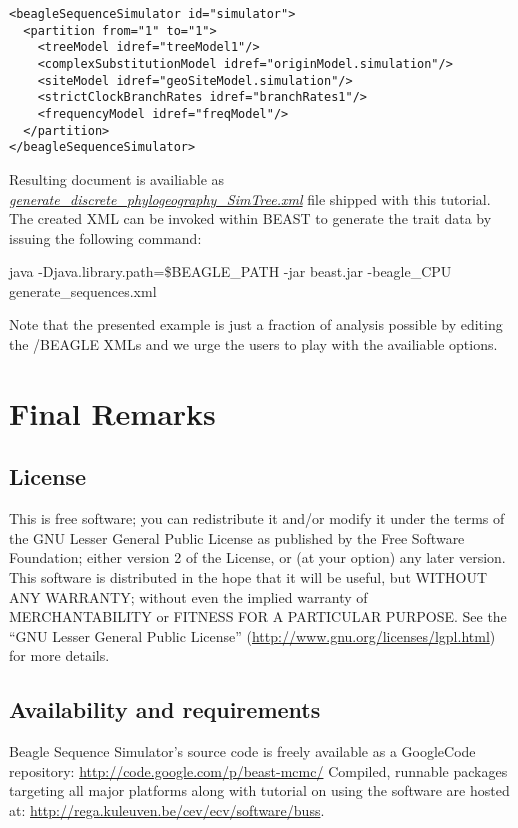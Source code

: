 \medskip{}

\begin{lstlisting}
<beagleSequenceSimulator id="simulator">
  <partition from="1" to="1"> 
    <treeModel idref="treeModel1"/>
    <complexSubstitutionModel idref="originModel.simulation"/>	    
    <siteModel idref="geoSiteModel.simulation"/>
    <strictClockBranchRates idref="branchRates1"/>
    <frequencyModel idref="freqModel"/>
  </partition>
</beagleSequenceSimulator>
\end{lstlisting}

\medskip{}

Resulting document is availiable as \href{http://rega.kuleuven.be/cev/ecv/software/buss_files/generate\_discrete\_phylogeography\_SimTree.xml}{\emph{generate\_discrete\_phylogeography\_SimTree.xml}} file shipped with this tutorial.
The created XML can be invoked within BEAST to generate the trait data by issuing the following command:

\begin{code}
java -Djava.library.path=\$BEAGLE\_PATH -jar beast.jar -beagle\_CPU generate\_sequences.xml
\end{code}

Note that the presented example is just a fraction of analysis possible by editing the \bussname/BEAGLE XMLs and we urge the users to play with the availiable options. 

\section{Final Remarks}

\subsection{License}
This is free software; you can redistribute it and/or modify it under the terms of the {GNU} Lesser General Public License as published by the Free Software Foundation; either version 2 of the License, or (at your option) any later version. This software is distributed in the hope that it will be useful, but {WITHOUT ANY WARRANTY}; without even the implied warranty of {MERCHANTABILITY} or {FITNESS FOR A PARTICULAR PURPOSE}. See the ``GNU Lesser General Public License'' (\url{http://www.gnu.org/licenses/lgpl.html}) for more details.

\subsection{Availability and requirements}
Beagle Sequence Simulator's source code is freely available as a GoogleCode repository:
\url{http://code.google.com/p/beast-mcmc/}
Compiled, runnable packages targeting all major platforms along with tutorial on using the software are hosted at:
\url{http://rega.kuleuven.be/cev/ecv/software/buss}.

